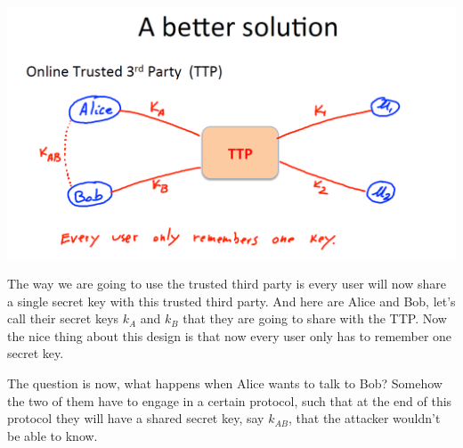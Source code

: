 \documentclass[11pt]{article}
\makeatletter
\def\maxwidth{\ifdim\Gin@nat@width>\linewidth\linewidth
    \else\Gin@nat@width\fi}
\let\Oldincludegraphics\includegraphics
\renewcommand{\includegraphics}[1]{\Oldincludegraphics[width=.8\maxwidth]{#1}}
\makeatother
\begin{document}
\includegraphics{./Images/KeyManageSol-TTP.png}

The way we are going to use the trusted third party is every user will
now share a single secret key with this trusted third party. And here
are Alice and Bob, let's call their secret keys \(k_{A}\) and \(k_{B}\)
that they are going to share with the TTP. Now the nice thing about this
design is that now every user only has to remember one secret key.

The question is now, what happens when Alice wants to talk to Bob?
Somehow the two of them have to engage in a certain protocol, such that
at the end of this protocol they will have a shared secret key, say
\(k_{AB}\), that the attacker wouldn't be able to know.
\end{document}
